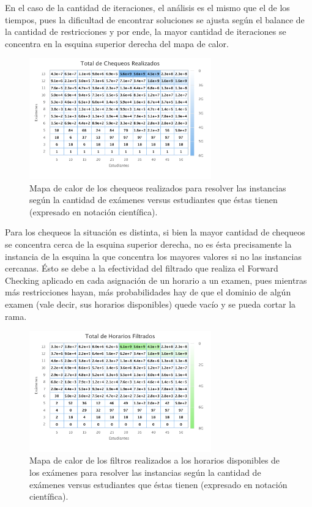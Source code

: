 \documentclass[letter, 10pt]{article}
\begin{document}
En el caso de la cantidad de iteraciones, el análisis es el mismo que el de los tiempos, pues la dificultad de encontrar soluciones se ajusta según el balance de la cantidad de restricciones y por ende, la mayor cantidad de iteraciones se concentra en la esquina superior derecha del mapa de calor. 

\begin{figure}[H]
\begin{center}
\includegraphics[width=0.7\textwidth]{img/g3.pdf}
\end{center}
\caption{Mapa de calor de los chequeos realizados para resolver las instancias según la cantidad de exámenes versus estudiantes que éstas tienen (expresado en notación científica).}
\label{fig:g3}
\end{figure}

Para los chequeos la situación es distinta, si bien la mayor cantidad de chequeos se concentra cerca de la esquina superior derecha, no es ésta precisamente la instancia de la esquina la que concentra los mayores valores si no las instancias cercanas. Ésto se debe a la efectividad del filtrado que realiza el Forward Checking aplicado en cada asignación de un horario a un examen, pues mientras más restricciones hayan, más probabilidades hay de que el dominio de algún examen (vale decir, sus horarios disponibles) quede vacío y se pueda cortar la rama.

\begin{figure}[H]
\begin{center}
\includegraphics[width=0.7\textwidth]{img/g4.pdf}
\end{center}
\caption{Mapa de calor de los filtros realizados a los horarios disponibles de los exámenes para resolver las instancias según la cantidad de exámenes versus estudiantes que éstas tienen (expresado en notación científica).}
\label{fig:g4}
\end{figure}
\end{document}
